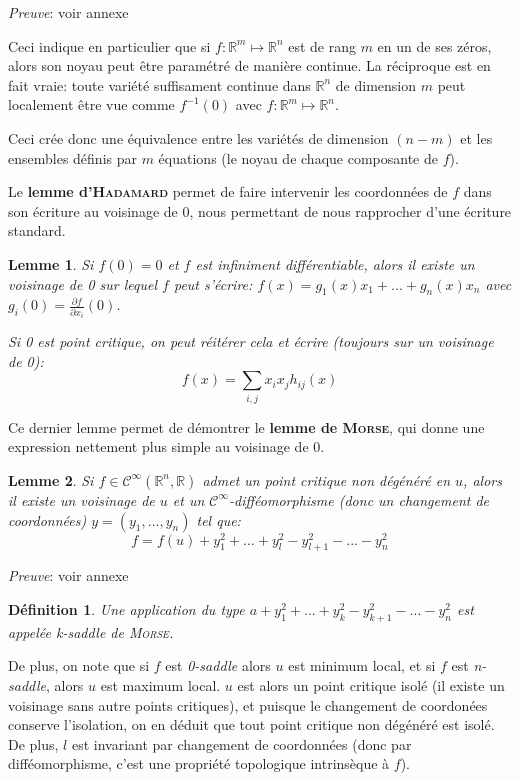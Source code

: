 \documentclass{article}
\newtheorem{defn}{Définition}
\newtheorem{lemm}{Lemme}
\begin{document}
\textit{Preuve}: voir annexe

Ceci indique en particulier que si $f:\mathbb{R}^m\mapsto\mathbb{R}^n$ est de rang $m$ en un de ses zéros, alors son noyau peut être paramétré de manière continue.
La réciproque est en fait vraie: toute variété suffisament continue dans $\mathbb{R}^n$ de dimension $m$ peut localement être vue comme $f^{-1}(0)$ avec $f:\mathbb{R}^m\mapsto\mathbb{R}^n$.

Ceci crée donc une équivalence entre les variétés de dimension $(n-m)$ et les ensembles définis par $m$ équations (le noyau de chaque composante de $f$).

Le \textbf{lemme d'\textsc{Hadamard}} permet de faire intervenir les coordonnées de $f$ dans son écriture au voisinage de $0$, nous permettant de nous rapprocher d'une écriture standard.

\begin{lemm}
Si $f(0)=0$ et $f$ est infiniment différentiable, alors il existe un voisinage de 0 sur lequel $f$ peut s'écrire: $f(x)=g_1(x)x_1+...+g_n(x)x_n$ avec $g_i(0) = \frac{\partial f}{\partial x_i}(0)$.

Si 0 est point critique, on peut réitérer cela et écrire (toujours sur un voisinage de 0): $$f(x)=\sum_{i,j} x_ix_jh_{ij}(x)$$
\end{lemm}

Ce dernier lemme permet de démontrer le \textbf{lemme de \textsc{Morse}}, qui donne une expression nettement plus simple au voisinage de $0$.

\begin{lemm}
Si $f\in\mathcal{C}^\infty(\mathbb{R}^n,\mathbb{R})$ admet un point critique non dégénéré en $u$, alors il existe un voisinage de $u$ et un $\mathcal{C}^\infty$-difféomorphisme (donc un changement de coordonnées) $y=(y_1,...,y_n)$ tel que: $$f=f(u)+y_1^2+...+y_l^2-y_{l+1}^2-...-y_n^2$$
\end{lemm}

\textit{Preuve}: voir annexe

\begin{defn}
Une application du type $a+y_1^2+...+y_k^2-y_{k+1}^2-...-y_n^2$ est appelée \textit{k-saddle de \textsc{Morse}}.
\end{defn}

De plus, on note que si $f$ est \textit{0-saddle} alors $u$ est minimum local, et si $f$ est \textit{n-saddle}, alors $u$ est maximum local.
$u$ est alors un point critique isolé (il existe un voisinage sans autre points critiques), et puisque le changement de coordonées conserve l'isolation, on en déduit que tout point critique non dégénéré est isolé. De plus, $l$ est invariant par changement de coordonnées (donc par difféomorphisme, c'est une propriété topologique intrinsèque à $f$).
\end{document}
